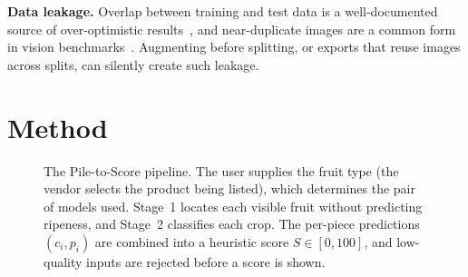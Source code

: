 \documentclass[10pt,twocolumn]{article}
\begin{document}
\textbf{Data leakage.} Overlap between training and test data is a well-documented source of over-optimistic results~\cite{kaufman2012leakage,kapoor2023leakage}, and near-duplicate images are a common form in vision benchmarks~\cite{barz2020}. Augmenting before splitting, or exports that reuse images across splits, can silently create such leakage.

\section{Method}\label{sec:method}

\begin{figure}[t]
\centering
{}
\caption{The Pile-to-Score pipeline. The user supplies the fruit type (the vendor selects the product being listed), which determines the pair of models used. Stage~1 locates each visible fruit without predicting ripeness, and Stage~2 classifies each crop. The per-piece predictions $(c_i,p_i)$ are combined into a heuristic score $S\in[0,100]$, and low-quality inputs are rejected before a score is shown.}
\label{fig:pipeline}
\end{figure}
\end{document}
